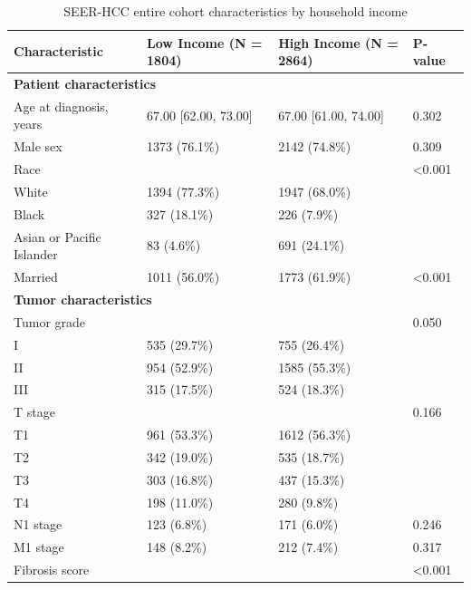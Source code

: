 \begin{table}[!htbp]
\centering
\small
\caption{SEER-HCC entire cohort characteristics by household income}
\begin{tabular}{llll}
\toprule
Characteristic & Low Income (N = 1804) & High Income (N = 2864) & P-value \\
\midrule
\multicolumn{4}{l}{\textbf{Patient characteristics}} \\
Age at diagnosis, years & 67.00 [62.00, 73.00] & 67.00 [61.00, 74.00] & 0.302 \\
Male sex & 1373 (76.1\%) & 2142 (74.8\%) & 0.309 \\
Race &  &  & \textless{}0.001 \\
\hspace{1em}White & 1394 (77.3\%) & 1947 (68.0\%) &  \\
\hspace{1em}Black & 327 (18.1\%) & 226 (7.9\%) &  \\
\hspace{1em}Asian or Pacific Islander & 83 (4.6\%) & 691 (24.1\%) &  \\
Married & 1011 (56.0\%) & 1773 (61.9\%) & \textless{}0.001 \\
\midrule
\multicolumn{4}{l}{\textbf{Tumor characteristics}} \\
Tumor grade &  &  & 0.050 \\
\hspace{1em}I & 535 (29.7\%) & 755 (26.4\%) &  \\
\hspace{1em}II & 954 (52.9\%) & 1585 (55.3\%) &  \\
\hspace{1em}III & 315 (17.5\%) & 524 (18.3\%) &  \\
T stage &  &  & 0.166 \\
\hspace{1em}T1 & 961 (53.3\%) & 1612 (56.3\%) &  \\
\hspace{1em}T2 & 342 (19.0\%) & 535 (18.7\%) &  \\
\hspace{1em}T3 & 303 (16.8\%) & 437 (15.3\%) &  \\
\hspace{1em}T4 & 198 (11.0\%) & 280 (9.8\%) &  \\
N1 stage & 123 (6.8\%) & 171 (6.0\%) & 0.246 \\
M1 stage & 148 (8.2\%) & 212 (7.4\%) & 0.317 \\
Fibrosis score &  &  & \textless{}0.001 \\

\end{tabular}
\end{table}
